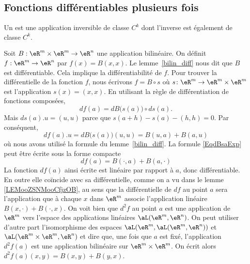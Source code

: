 \subsection{Fonctions différentiables plusieurs fois}

\begin{definition}
	Un  est une application inversible de classe \( C^k\) dont l'inverse est également de classe \( C^k\).
\end{definition}

\begin{example}\label{bilin_2diff}
	Soit \( B:\eR^m\times \eR^m\to\eR^n\) une application bilinéaire. On définit \( f:\eR^m\to\eR^n\) par \( f(x)=B(x,x)\). Le lemme~\ref{bilin_diff} nous dit que \( B\) est différentiable. Cela implique la différentiabilité de \( f\). Pour trouver la différentielle de la fonction \( f\), nous écrivons \( f=B\circ s\) où \( s\colon \eR^m\to \eR^m\times\eR^m\) est l'application \( s(x)=(x,x)\). En utilisant la règle de différentiation de fonctions composées,
	\begin{equation}
		df(a)=dB\big( s(a) \big)\circ ds(a).
	\end{equation}
	Mais \( ds(a).u=(u,u)\) parce que \( s(a+h)-s(a)-(h,h)=0\). Par conséquent,
	\begin{equation}		\label{EqdBsaExp}
		df(a).u=dB\big( s(a) \big)(u,u)=B(u,a)+B(a,u)
	\end{equation}
	où nous avons utilisé la formule du lemme~\ref{bilin_diff}. La formule \eqref{EqdBsaExp} peut être écrite sous la forme compacte
	\begin{equation}
		df(a)=B(\cdot,a)+B(a,\cdot)
	\end{equation}
	La fonction \( df(a)\) ainsi écrite est linéaire par rapport à \( a\), donc différentiable. En outre elle coïncide avec sa différentielle, comme on a vu dans le lemme \ref{LEMooZSNMooCfjzOB}, au sens que la différentielle de \( df\) au point \( a\) sera l'application que à chaque \( x\) dans \( \eR^m\) associe l'application linéaire \( B(x,\cdot)+B(\cdot, x)\). On voit bien que \( d^2f\) au point \( a\) est une application de \( \eR^m\) vers l'espace des applications linéaires \( \aL(\eR^m, \eR^n)\). On peut utiliser d'autre part l'isomorphisme des espaces \( \aL(\eR^m,\aL(\eR^m, \eR^n) )\) et \( \aL(\eR^m\times\eR^m, \eR^n )\) et dire que, une fois que \( a\) est fixé, l'application \( d^2f(a)\) est une application bilinéaire sur \( \eR^m\times\eR^m\). On écrit alors \( d^2f(a)(x,y)=B(x,y)+B(y,x)\).
\end{example}

